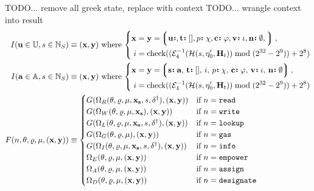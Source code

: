 TODO... remove all greek state, replace with context
TODO... wrangle context into result
\begin{align}
  I(\mathbf{u} \in \mathbb{U}, s \in \N_S) &\equiv (\mathbf{x}, \mathbf{y}) \text{ where }
  \left\{ \begin{aligned}
    \mathbf{x} &= \mathbf{y} = \tup{
      \is{\mathbf{u}}{},
      \is{\mathbf{t}}{[]},
      \is{p}{\chi},
      \is{\mathbf{c}}{\varphi},
      \is{\mathbf{v}}{\iota},
      \is{\mathbf{n}}{\emptyset},
    }\ ,\\
    i &= \text{check}((\de_4(\mathcal{H}(s, \eta'_0, \mathbf{H}_t)) \bmod (2^{32}-2^9)) + 2^8)
  \end{aligned} \right. \\
  I(\mathbf{a} \in \mathbb{A}, s \in \N_S) &\equiv (\mathbf{x}, \mathbf{y}) \text{ where }
  \left\{ \begin{aligned}
    \mathbf{x} &= \mathbf{y} = \tup{\is{\mathbf{s}}{\mathbf{a}}\ts\is{\mathbf{t}}{[]}\ts i\ts\is{p}{\chi}\ts\is{\mathbf{c}}{\varphi}\ts\is{\mathbf{v}}{\iota}\ts\is{\mathbf{n}}{\emptyset}}\ ,\\
    i &= \text{check}((\de_4(\mathcal{H}(s, \eta'_0, \mathbf{H}_t)) \bmod (2^{32}-2^9)) + 2^8)
  \end{aligned} \right. \\
  F(n, \theta, \varrho, \mu, (\mathbf{x}, \mathbf{y})) &\equiv \begin{cases}
    G(\Omega_R(\theta, \varrho, \mu, \mathbf{x}_\mathbf{s}, s, \delta^\dagger), (\mathbf{x}, \mathbf{y})) &\when n = \mathtt{read} \\
    G(\Omega_W(\theta, \varrho, \mu, \mathbf{x}_\mathbf{s}), (\mathbf{x}, \mathbf{y})) &\when n = \mathtt{write} \\
    G(\Omega_L(\theta, \varrho, \mu, \mathbf{x}_\mathbf{s}, s, \delta^\dagger), (\mathbf{x}, \mathbf{y})) &\when n = \mathtt{lookup} \\
    G(\Omega_G(\theta, \varrho, \mu), (\mathbf{x}, \mathbf{y})) &\when n = \mathtt{gas} \\
    G(\Omega_I(\theta, \varrho, \mu, \mathbf{x}_\mathbf{s}, s, \delta^\dagger), (\mathbf{x}, \mathbf{y})) &\when n = \mathtt{info} \\
    \Omega_E(\theta, \varrho, \mu, (\mathbf{x}, \mathbf{y})) &\when n = \mathtt{empower}\\
    \Omega_A(\theta, \varrho, \mu, (\mathbf{x}, \mathbf{y})) &\when n = \mathtt{assign}\\
    \Omega_D(\theta, \varrho, \mu, (\mathbf{x}, \mathbf{y})) &\when n = \mathtt{designate}\\

\end{cases}
\end{align}
